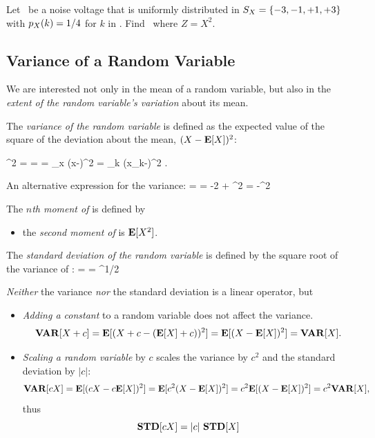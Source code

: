 	\item {}
	Let \X\ be a noise voltage that is uniformly distributed
	in $S_X = \{-3, -1, +1, +3\}$
	with $p_{X}(k) = 1/4$ for $k$ in \ssx.
	Find \  where $Z = X^2$.

\eit


\subsection{Variance of a Random Variable}
\bit
	\item
	We are interested not only in the mean of a random variable,
	but also in the \emph{extent of the random variable's variation} about its mean.

	\newcommand{\mx}{\expect{X}}
	\item The \emph{variance of the random variable \X}
	is defined as the expected value of the square of the deviation about the mean,
	$(X-{\bf E}[X])^2$:

		^2 =  = 
		= \sum_{x\in\ssx} (x-)^2 
		= \sum_k (x_k-)^2 .
	\eeql

	An alternative expression for the variance:
		\Exp{(X-\mx)^2}
		 = \Exp{X^2-2 \mx X + \mx^2}
		 = -2 \mx {} + \mx^2
		 = -\mx^2
	\eeql

	\item The \emph{$n$th moment of \X} is defined by
	\eeql
	\begin{itemize}
		\item the \emph{second moment of \X} is ${\bf E}[X^2]$.
	\end{itemize}


	\item The \emph{standard deviation of the random variable \X} is defined
	by the square root of the variance of \X:
		 =  = ^{1/2}
	\eeql

	\item \emph{Neither} the variance \emph{nor} the standard deviation is a linear operator, but
	\begin{itemize}
		\item \emph{Adding a constant} to a random variable
		does not affect the variance.
		\[
			{\bf VAR}[X+c]
			= {\bf E}[(X+c - ({\bf E}[X]+c))^2]
			= {\bf E}[(X - {\bf E}[X])^2]
			= {\bf VAR}[X].
		\]

		\item \emph{Scaling a random variable} by $c$
		scales the variance by $c^2$ and the standard deviation by $|c|$:
		\[
			{\bf VAR}[cX]
			= {\bf E}[(cX - c{\bf E}[X])^2]
			= {\bf E}[c^2(X - {\bf E}[X])^2]
			= c^2{\bf E}[(X - {\bf E}[X])^2]
			= c^2{\bf VAR}[X],
		\]
		thus
		\[
			{\bf STD}[cX] = |c|~{\bf STD}[X]
		\]

	\end{itemize}

